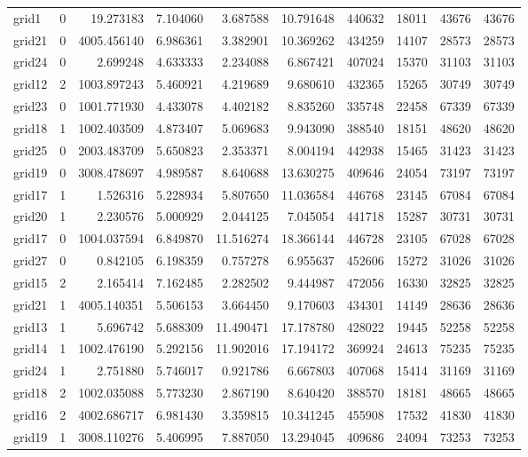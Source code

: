 \begin{longtable}{|l|r|r|r|r|r|r|r|r|r|}
grid1 & 0 & 19.273183 & 7.104060 & 3.687588 & 10.791648 & 440632 & 18011 & 43676 & 43676 \\
grid21 & 0 & 4005.456140 & 6.986361 & 3.382901 & 10.369262 & 434259 & 14107 & 28573 & 28573 \\
grid24 & 0 & 2.699248 & 4.633333 & 2.234088 & 6.867421 & 407024 & 15370 & 31103 & 31103 \\
grid12 & 2 & 1003.897243 & 5.460921 & 4.219689 & 9.680610 & 432365 & 15265 & 30749 & 30749 \\
grid23 & 0 & 1001.771930 & 4.433078 & 4.402182 & 8.835260 & 335748 & 22458 & 67339 & 67339 \\
grid18 & 1 & 1002.403509 & 4.873407 & 5.069683 & 9.943090 & 388540 & 18151 & 48620 & 48620 \\
grid25 & 0 & 2003.483709 & 5.650823 & 2.353371 & 8.004194 & 442938 & 15465 & 31423 & 31423 \\
grid19 & 0 & 3008.478697 & 4.989587 & 8.640688 & 13.630275 & 409646 & 24054 & 73197 & 73197 \\
grid17 & 1 & 1.526316 & 5.228934 & 5.807650 & 11.036584 & 446768 & 23145 & 67084 & 67084 \\
grid20 & 1 & 2.230576 & 5.000929 & 2.044125 & 7.045054 & 441718 & 15287 & 30731 & 30731 \\
grid17 & 0 & 1004.037594 & 6.849870 & 11.516274 & 18.366144 & 446728 & 23105 & 67028 & 67028 \\
grid27 & 0 & 0.842105 & 6.198359 & 0.757278 & 6.955637 & 452606 & 15272 & 31026 & 31026 \\
grid15 & 2 & 2.165414 & 7.162485 & 2.282502 & 9.444987 & 472056 & 16330 & 32825 & 32825 \\
grid21 & 1 & 4005.140351 & 5.506153 & 3.664450 & 9.170603 & 434301 & 14149 & 28636 & 28636 \\
grid13 & 1 & 5.696742 & 5.688309 & 11.490471 & 17.178780 & 428022 & 19445 & 52258 & 52258 \\
grid14 & 1 & 1002.476190 & 5.292156 & 11.902016 & 17.194172 & 369924 & 24613 & 75235 & 75235 \\
grid24 & 1 & 2.751880 & 5.746017 & 0.921786 & 6.667803 & 407068 & 15414 & 31169 & 31169 \\
grid18 & 2 & 1002.035088 & 5.773230 & 2.867190 & 8.640420 & 388570 & 18181 & 48665 & 48665 \\
grid16 & 2 & 4002.686717 & 6.981430 & 3.359815 & 10.341245 & 455908 & 17532 & 41830 & 41830 \\
grid19 & 1 & 3008.110276 & 5.406995 & 7.887050 & 13.294045 & 409686 & 24094 & 73253 & 73253 \\

\end{longtable}
